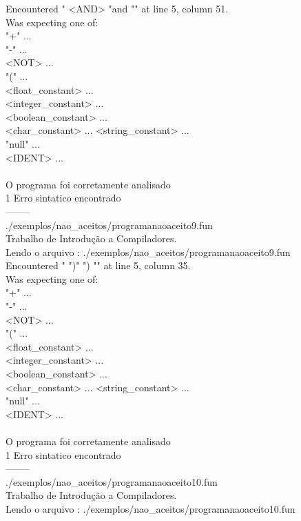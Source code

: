 \documentclass[
	article,			%
	11pt,				%
	oneside,			%
	a4paper,			%
	portuguese,			%
	brazil,				%
	sumario=tradicional
	]{abntex2}
\begin{document}
Encountered " <AND> "and "" at line 5, column 51.\\
Was expecting one of:\\
    "+" ...\\
    "-" ...\\
    <NOT> ...\\
    "(" ...\\
    <float\_constant> ...\\
    <integer\_constant> ...\\
    <boolean\_constant> ...\\
    <char\_constant> ...
    <string\_constant> ...\\
    "null" ...\\
    <IDENT> ...\\
\\
O programa foi corretamente analisado\\
1 Erro sintatico encontrado\\
--------\\
./exemplos/nao\_aceitos/programanaoaceito9.fun\\
Trabalho de Introdução a Compiladores.\\
Lendo o arquivo : ./exemplos/nao\_aceitos/programanaoaceito9.fun\\
Encountered " ")" ") "" at line 5, column 35.\\
Was expecting one of:\\
    "+" ...\\
    "-" ...\\
    <NOT> ...\\
    "(" ...\\
    <float\_constant> ...\\
    <integer\_constant> ...\\
    <boolean\_constant> ...\\
    <char\_constant> ...
    <string\_constant> ...\\
    "null" ...\\
    <IDENT> ...\\
\\
O programa foi corretamente analisado\\
1 Erro sintatico encontrado\\
--------\\
./exemplos/nao\_aceitos/programanaoaceito10.fun\\
Trabalho de Introdução a Compiladores.\\
Lendo o arquivo : ./exemplos/nao\_aceitos/programanaoaceito10.fun\\
\end{document}
